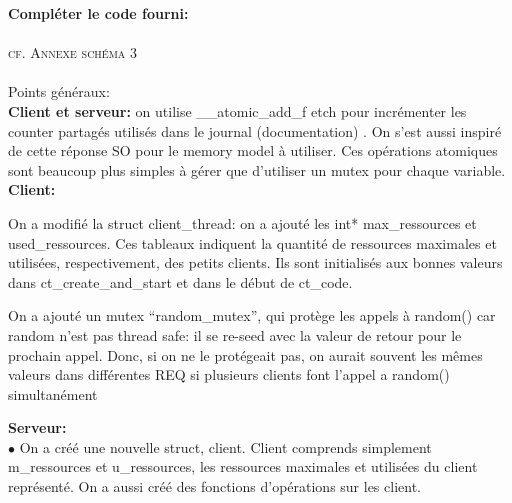 \documentclass[11pt]{article}
\begin{document}
\textbf{Compléter le code fourni:}
\\\\
\textsc{cf. Annexe schéma 3}
\\\\
Points généraux:\\
\textbf{Client et serveur:}
on utilise \_\_atomic\_add\_f etch pour incrémenter les counter partagés utilisés dans le journal (documentation) . On s’est aussi inspiré de cette réponse SO pour le memory model à utiliser. Ces opérations atomiques sont beaucoup plus simples à gérer que d’utiliser un mutex pour chaque variable.
\textbf{Client:}\\
\begin{description}[font=$\bullet$]
 \item On a modifié la struct client\_thread: on a ajouté les int* max\_ressources et used\_ressources. Ces tableaux indiquent la quantité de ressources maximales et utilisées, respectivement, des petits clients. Ils sont initialisés aux bonnes valeurs dans ct\_create\_and\_start et dans le début de ct\_code.
 \item On a ajouté un mutex “random\_mutex”, qui protège les appels à random() car random n'est pas thread safe: il se re-seed avec la valeur de retour pour le prochain appel. Donc, si on ne le protégeait pas, on aurait souvent les mêmes valeurs dans différentes REQ si plusieurs clients font l'appel a random() simultanément
\end{description}
\textbf{Serveur:}\\
$\bullet$ On a créé une nouvelle struct, client. Client comprends simplement m\_ressources et u\_ressources, les ressources maximales et utilisées du client représenté. 
On a aussi créé des fonctions d’opérations sur les client.
\end{document}
